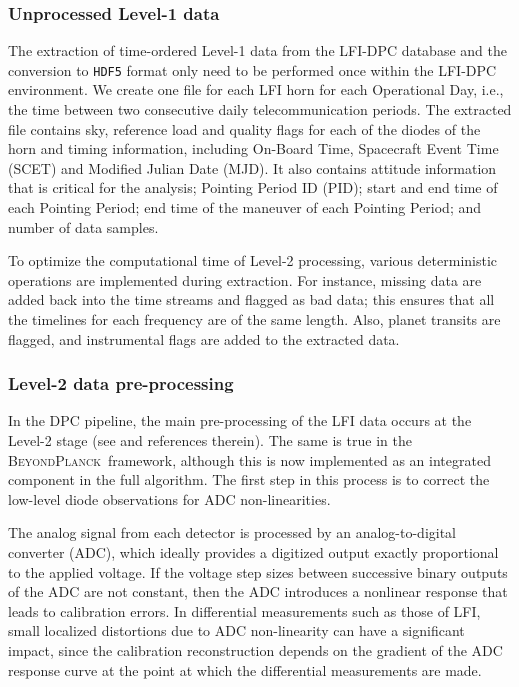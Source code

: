 \documentclass[twocolumn]{aa}
\newcommand{\BP}{\textsc{BeyondPlanck}}
\begin{document}
\subsubsection{Unprocessed Level-1 data}

The extraction of time-ordered Level-1 data from the LFI-DPC database
and the conversion to \texttt{HDF5} format only need to be performed once
within the LFI-DPC environment. We create one file for each LFI horn for
each Operational Day, i.e., the time between two consecutive daily
telecommunication periods. The extracted file contains sky, reference
load and quality flags for each of the diodes of the horn and timing
information, including On-Board Time, Spacecraft Event Time (SCET) and
Modified Julian Date (MJD). It also contains attitude information that
is critical for the analysis; Pointing Period ID (PID); start and end
time of each Pointing Period; end time of the maneuver of each
Pointing Period; and number of data samples.

To optimize the computational time of Level-2 processing, various
deterministic operations are implemented during extraction. For
instance, missing data are added back into the time streams and
flagged as bad data; this ensures that all the timelines for each
frequency are of the same length. Also, planet transits are flagged,
and instrumental flags are added to the extracted data.
		
\subsubsection{Level-2 data pre-processing}

In the DPC pipeline, the main pre-processing of the LFI data occurs at
the Level-2 stage (see \citealp{planck2016-l02} and references
therein).  The same is true in the \BP\ framework, although this is
now implemented as an integrated component in the full algorithm. The
first step in this process is to correct the low-level diode
observations for ADC non-linearities.

The analog signal from each detector is processed by an
analog-to-digital converter (ADC), which ideally provides a digitized
output exactly proportional to the applied voltage.  If the voltage
step sizes between successive binary outputs of the ADC are not
constant, then the ADC introduces a nonlinear response that leads to
calibration errors.  In differential measurements such as those of
LFI, small localized distortions due to ADC non-linearity can have a
significant impact, since the calibration reconstruction depends on
the gradient of the ADC response curve at the point at which the
differential measurements are made.
\end{document}
